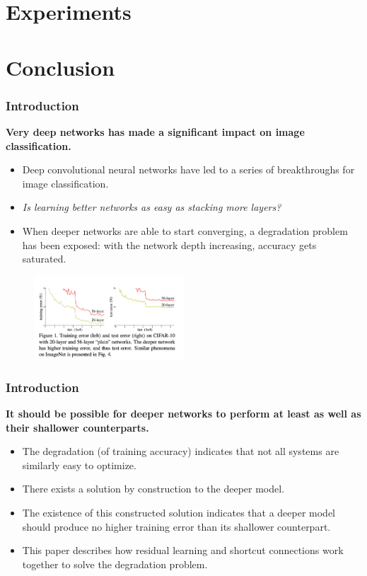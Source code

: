\documentclass[
	11pt, %
]{beamer}
\begin{document}
\section{Experiments}

\section{Conclusion}

\begin{frame}
	\frametitle{Introduction}

	\textbf{Very deep networks has made a significant impact on image classification.}
	
	\begin{itemize}
		\item Deep convolutional neural networks have led to a series of breakthroughs for image classification.
		\item \textit{Is learning better networks as easy as stacking more layers?}
		\item When deeper networks are able to start converging, a degradation problem has been exposed: with the network depth increasing, accuracy gets saturated.
	\end{itemize}

	\begin{figure}
		\centering
		\includegraphics[width=0.5\textwidth]{./images/Screenshot 2025-05-20 at 0.22.01.png}
	\end{figure}
\end{frame}

\begin{frame}
	\frametitle{Introduction}

	\textbf{It should be possible for deeper networks to perform at least as well as their shallower counterparts.}
	
	\begin{itemize}
		\item The degradation (of training accuracy) indicates that not all systems are similarly easy to optimize.
		\item There exists a solution by construction to the deeper model.
		\item The existence of this constructed solution indicates that a deeper model should produce no higher training error than its shallower counterpart.
		\item This paper describes how residual learning and shortcut connections work together to solve the degradation problem.
	\end{itemize}
\end{frame}
\end{document}
